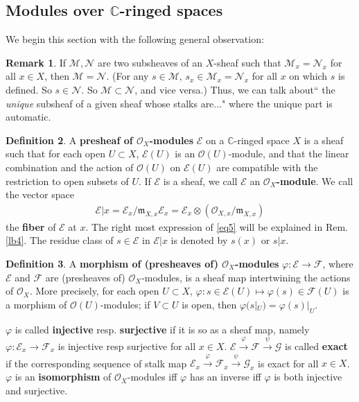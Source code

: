 \documentclass[12pt,b5paper,notitlepage]{report}
\theoremstyle{definition}
\newtheorem{df}{Definition}[section]
\newtheorem{rem}[df]{Remark}
\theoremstyle{plain}
\newcommand{\fk}{\mathfrak}
\newcommand{\scr}{\mathscr}
\newcommand{\Cbb}{\mathbb C}
\numberwithin{equation}{section}
\begin{document}
\subsection{Modules over $\Cbb$-ringed spaces}

We begin this section with the following general observation:
\begin{rem}\label{lb11}
If $\scr M,\scr N$ are two subsheaves of an $X$-sheaf such that $\scr M_x=\scr N_x$ for all $x\in X$, then $\scr M=\scr N$. (For any $s\in \scr M$, $s_x\in\scr M_x=\scr N_x$ for all $x$ on which $s$ is defined. So $s\in\scr N$. So $\scr M\subset\scr N$, and vice versa.) Thus, we can talk about`` the \emph{unique} subsheaf of a given sheaf whose stalks are..." where the unique part is automatic. 
\end{rem}

\begin{df}
A \textbf{presheaf of $\scr O_X$-modules} $\scr E$ on a $\Cbb$-ringed space $X$ is a sheaf such that for each open $U\subset X$, $\scr E(U)$ is an $\scr O(U)$-module, and that the linear combination and the action of $\scr O(U)$ on $\scr E(U)$ are compatible with the restriction to open subsets of $U$. If $\scr E$ is a sheaf, we call $\scr E$ an \textbf{$\scr O_X$-module}. We call the vector space \index{00@Fiber $\scr E\lvert x=\scr E_x/{\fk m_{X,x}\scr E_x}=\scr E_x\otimes(\scr O_{X,x}/\fk m_{X,x})$}
\begin{align}
\scr E|x=\scr E_x/{\fk m_{X,x}\scr E_x}=\scr E_x\otimes(\scr O_{X,x}/\fk m_{X,x})\label{eq5}
\end{align}
the \textbf{fiber} of $\scr E$ at $x$. The right most expression of \eqref{eq5} will be explained in Rem. \ref{lb4}. The residue class of $s\in \scr E$ in $\scr E|x$ is denoted by $s(x)$ or $s|x$. 
\end{df}

\begin{df}
A \textbf{morphism of (presheaves of) $\scr O_X$-modules} $\varphi:\scr E\rightarrow\scr F$, where $\scr E$ and $\scr F$ are (presheaves of) $\scr O_X$-modules, is a sheaf map intertwining the actions of $\scr O_X$. More precisely, for each open $U\subset X$, $\varphi:s\in\scr E(U)\mapsto \varphi(s)\in\scr F(U)$ is a morphism of $\scr O(U)$-modules; if $V\subset U$ is open, then $\varphi(s|_U)=\varphi(s)|_U$. 

$\varphi$ is called \textbf{injective} resp. \textbf{surjective} if it is so as a sheaf map, namely $\varphi:\scr E_x\rightarrow\scr F_x$ is injective resp surjective for all $x\in X$. $\scr E\xrightarrow{\varphi}\scr F\xrightarrow{\psi}\scr G$ is called \textbf{exact} if the corresponding sequence of stalk map $\scr E_x\xrightarrow{\varphi}\scr F_x\xrightarrow{\psi}\scr G_x$ is exact for all $x\in X$. $\varphi$ is an \textbf{isomorphism} of $\scr O_X$-modules iff $\varphi$ has an inverse iff $\varphi$ is both injective and surjective. \hfill\qedsymbol
\end{df}
\end{document}

